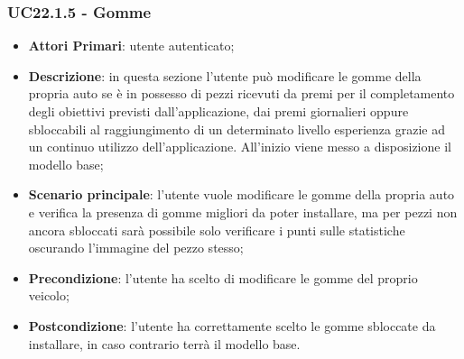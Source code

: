 \subsubsection{UC22.1.5 - Gomme}
\begin{itemize}
	\item \textbf{Attori Primari}: utente autenticato;
	\item \textbf{Descrizione}: in questa sezione l'utente può modificare le gomme della propria auto se è in possesso di pezzi ricevuti da premi per il completamento degli obiettivi previsti dall'applicazione, dai premi giornalieri oppure sbloccabili al raggiungimento di un determinato livello esperienza grazie ad un continuo utilizzo dell'applicazione.
	All'inizio viene messo a disposizione il modello base;
	\item \textbf{Scenario principale}: l'utente vuole modificare le gomme della propria auto e verifica la presenza di gomme migliori da poter installare, ma per pezzi non ancora sbloccati sarà possibile solo verificare i punti sulle statistiche oscurando l'immagine del pezzo stesso;
	\item \textbf{Precondizione}: l'utente ha scelto di modificare le gomme del proprio veicolo; 
	\item \textbf{Postcondizione}: l'utente ha correttamente scelto le gomme sbloccate da installare, in caso contrario terrà il modello base.
\end{itemize}

